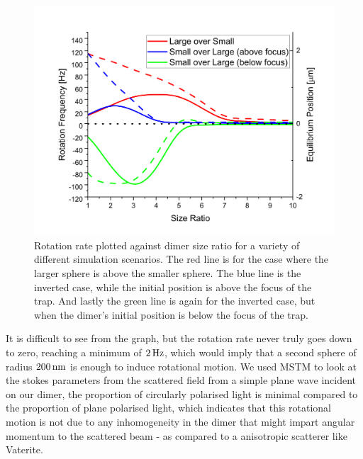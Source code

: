 \begin{figure}[h]
  \centering
  \includegraphics[width=\linewidth]{rotation_rate_vs_size.png}
  \caption{Rotation rate plotted against dimer size ratio for a variety of different simulation scenarios. The red line is for the case where the larger sphere is above the smaller sphere. The blue line is the inverted case, while the initial position is above the focus of the trap. And lastly the green line is again for the inverted case, but when the dimer's initial position is below the focus of the trap.}
\end{figure}

It is difficult to see from the graph, but the rotation rate never
truly goes down to zero, reaching a minimum of $2\,{\rm Hz}$, which would
imply that a second sphere of radius $200\,{\rm nm}$ is enough to
induce rotational motion.  We used MSTM to look at the stokes
parameters from the scattered field from a simple plane wave incident
on our dimer, the proportion of circularly polarised light is minimal
compared to the proportion of plane polarised light, which indicates
that this rotational motion is not due to any inhomogeneity in the
dimer that might impart angular momentum to the scattered beam - as
compared to a anisotropic scatterer like Vaterite.

